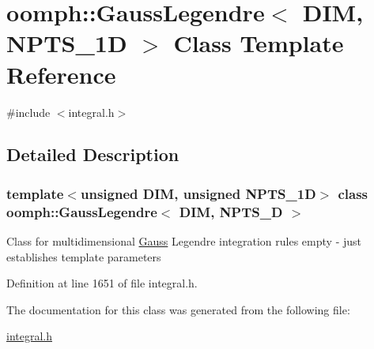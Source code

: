 \hypertarget{classoomph_1_1GaussLegendre}{}\section{oomph\+:\+:Gauss\+Legendre$<$ D\+IM, N\+P\+T\+S\+\_\+1D $>$ Class Template Reference}
\label{classoomph_1_1GaussLegendre}


{\ttfamily \#include $<$integral.\+h$>$}



\subsection{Detailed Description}
\subsubsection*{template$<$unsigned D\+IM, unsigned N\+P\+T\+S\+\_\+1D$>$\newline
class oomph\+::\+Gauss\+Legendre$<$ D\+I\+M, N\+P\+T\+S\+\_\+D $>$}

Class for multidimensional \hyperlink{classoomph_1_1Gauss}{Gauss} Legendre integration rules empty -\/ just establishes template parameters 

Definition at line 1651 of file integral.\+h.



The documentation for this class was generated from the following file\+:\begin{DoxyCompactItemize}
\item 
\hyperlink{integral_8h}{integral.\+h}\end{DoxyCompactItemize}

